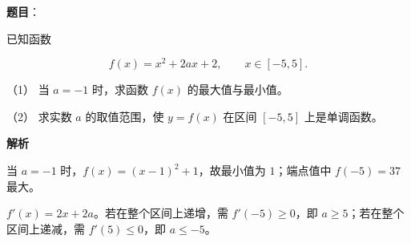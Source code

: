 \begin{answer}

\textbf{题目}：

已知函数

\nopagebreak[4]
\[
f(x)=x^2+2ax+2,\qquad x\in[-5,5].
\]

（1） 当 $a=-1$ 时，求函数 $f(x)$ 的最大值与最小值。

（2） 求实数 $a$ 的取值范围，使 $y=f(x)$ 在区间 $[-5,5]$ 上是单调函数。

\textbf{解析}


当 $a=-1$ 时，$f(x)=(x-1)^2+1$，故最小值为 $1$；端点值中 $f(-5)=37$ 最大。


$f'(x)=2x+2a$。若在整个区间上递增，需 $f'(-5)\ge0$，即 $a\ge5$；若在整个区间上递减，需 $f'(5)\le0$，即 $a\le-5$。



\end{answer}
